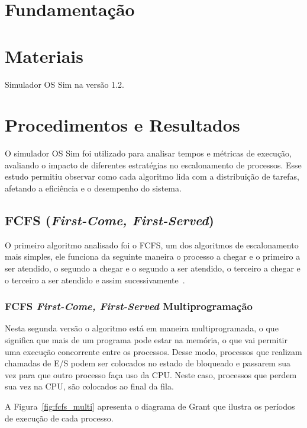 \documentclass[
	12pt,				%
	oneside,   	        %
	a4paper,			%
	english,			%
	french,				%
	spanish,			%
	brazil,				%
	]{pacotes/abntex2}
\begin{document}
\section{Fundamentação}
\label{sec:fundamentacao}

\section{Materiais}
\label{sec:materiais}

Simulador OS Sim na versão 1.2.

\section{Procedimentos e Resultados}
\label{sec:procedimentos}

O simulador OS Sim foi utilizado para analisar tempos e métricas de execução, avaliando o impacto de diferentes estratégias no escalonamento de processos. Esse estudo permitiu observar como cada algoritmo lida com a distribuição de tarefas, afetando a eficiência e o desempenho do sistema.

\subsection{FCFS (\textit{First-Come, First-Served})}
\label{subsec:fcfs}

O primeiro algoritmo analisado foi o FCFS, um dos algoritmos de escalonamento mais simples, ele funciona da seguinte maneira o processo a chegar e o primeiro a ser atendido, o segundo a chegar e o segundo a ser atendido, o terceiro a chegar e o terceiro a ser atendido e assim sucessivamente~\cite{maziero2019}. 

\subsubsection{FCFS \textit{First-Come, First-Served} Multiprogramação}
\label{subsubsec:multi_fcfs}

Nesta segunda versão o algoritmo está em maneira multiprogramada, o que significa que mais de um programa pode estar na memória, o que vai permitir uma execução concorrente entre os processos. Desse modo, processos que realizam chamadas de E/S podem ser colocados no estado de bloqueado e passarem sua vez para que outro processo faça uso da CPU. Neste caso, processos que perdem sua vez na CPU, são colocados ao final da fila. 

A Figura~\ref{fig:fcfs_multi} apresenta o diagrama de Grant que ilustra os períodos de execução de cada processo.
\end{document}
